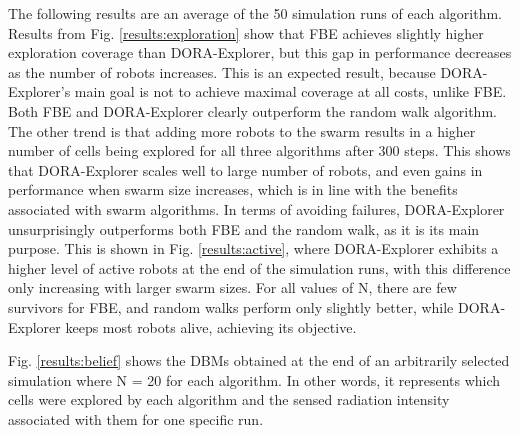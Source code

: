 The following results are an average of the 50 simulation runs of each algorithm. Results from Fig. \ref{results:exploration} show that FBE
achieves slightly higher exploration coverage than DORA-Explorer, but this
gap in performance decreases as the number of robots increases. This
is an expected result, because DORA-Explorer's main goal is not to achieve
maximal coverage at all costs, unlike FBE. Both FBE and DORA-Explorer clearly
outperform the random walk algorithm. The other trend is that adding
more robots to the swarm results in a higher
number of cells being explored for all three algorithms after 300
steps. This shows that DORA-Explorer scales well to large number of robots, and even gains in performance when swarm size increases, which is in line
with the benefits associated with swarm algorithms. In terms of avoiding failures, DORA-Explorer unsurprisingly outperforms both
FBE and the random walk, as it is its main purpose. This is shown in
Fig. \ref{results:active}, where DORA-Explorer exhibits a higher level of active
robots at the end of the simulation runs, with this difference only increasing with larger
swarm sizes. For all values of N, there are few
survivors for FBE, and random walks perform only slightly better, while DORA-Explorer keeps most robots alive, achieving its objective.


Fig. \ref{results:belief} shows the DBMs obtained at the end of an
arbitrarily selected simulation where N = 20 for each algorithm.  In
other words, it represents which cells were explored by each algorithm
and the sensed radiation intensity associated with them for one specific run. 

